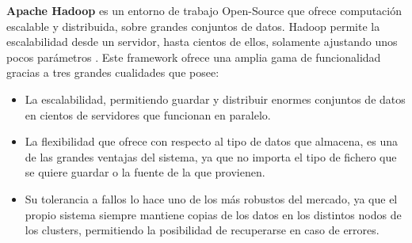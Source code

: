 \textbf{Apache Hadoop} \cite{HadoopInicial} es un entorno de trabajo Open-Source que ofrece computación escalable y distribuida, sobre grandes conjuntos de datos. Hadoop permite la escalabilidad desde un servidor, hasta cientos de ellos, solamente ajustando unos pocos parámetros \cite{HadoopInicial}. Este framework ofrece una amplia gama de funcionalidad gracias a tres grandes cualidades que posee:
\begin{itemize}
	\item La escalabilidad, permitiendo guardar y distribuir enormes conjuntos de datos en cientos de servidores que funcionan en paralelo. 
	\item La flexibilidad que ofrece con respecto al tipo de datos que almacena, es una de las grandes ventajas del sistema, ya que no importa el tipo de fichero que se quiere guardar o la fuente de la que provienen. 
	\item Su tolerancia a fallos lo hace uno de los más robustos del mercado, ya que el propio sistema siempre mantiene copias de los datos en los distintos nodos de los clusters, permitiendo la posibilidad de recuperarse en caso de errores.	
\end{itemize}

